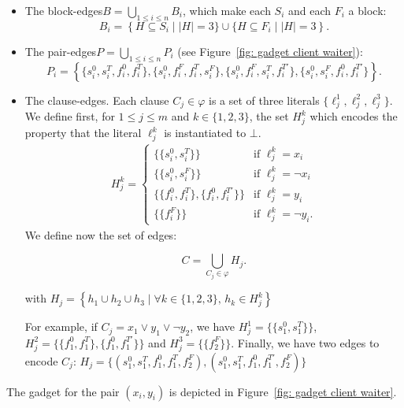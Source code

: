 \documentclass{article}
\newcommand{\hedges}{edges\xspace}
\begin{document}
\begin{itemize}[noitemsep]
    \item The block-\hedges $B = \bigcup_{1 \le i \le n} B_i$, which make each $S_i$ and each $F_i$ a block:
\[
    B_i = \left\{ H \subseteq S_i \mid  \lvert H \rvert=3\} \cup \{H \subseteq F_i \mid  \lvert H \rvert=3 \right\}.
\]


\item The pair-\hedges $P = \bigcup_{1 \le i \le n} P_i$ (see Figure~\ref{fig: gadget client waiter}):
\[ 
    P_i = \left\{ \{s_i^0, s_i^T, f_i^0, f_i^T \}, \{s_i^0, f_i^F, f_i^T, s_i^{F} \}, \{s_i^0, f_i^F, s_i^T, f_i^{T'} \}, \{s_i^0, s_i^F, f_i^0, f_i^{T'} \} \right \}.
\]



\item The clause-\hedges. Each clause $C_j \in \varphi$ is a set of three literals $\{\ell_{j}^1,\ell_{j}^2,\ell_{j}^3\}$. We define first, for $1 \le j \le m$ and $k \in \{ 1, 2, 3\}$, the set $H_{j}^k$ which encodes the property that the literal $\ell_{j}^k$ is instantiated to $\bot$. 
\begin{align*}
    H_{j}^k = \begin{cases} 
    \{\{s_{i}^0,s_{i}^T\}\} & \text{if } \ell_{j}^k = x_i \\
    \{\{s_{i}^0,s_{i}^F\}\} & \text{if } \ell_{j}^k = \neg x_i \\
    \{\{f_{i}^0,f_{i}^T\},\{f_{i}^0,f_{i}^{T'}\}\} & \text{if } \ell_{j}^k =  y_i \\
    \{\{f_{i}^F\}\} & \text{if } \ell_{j}^k = \neg y_i. 
    \end{cases}
\end{align*}
We define now the set of \hedges:
   
$$ C = \bigcup_{C_j \in \varphi} H_j. $$

\noindent with $H_j = \left\{ h_{1} \cup h_{2} \cup h_{3} \mid \forall k \in \{ 1,2,3 \},\, h_k \in H_{j}^k\right\}$

For example, if $C_j = x_1 \vee y_1 \vee \neg y_2$, we have $H_j^1 = \{ \{s_1^0, s_1^T\} \}$, $H_j^2 = \{ \{f_1^0, f_1^T\}, \{ f_1^0, f_1^{T'}\} \}$ and $H_j^3 = \{\{ f_2^F\}\}$. Finally, we have two \hedges to encode $C_j$: $H_j = \{ (s_1^0, s_1^T, f_1^0, f_1^{T}, f_2^F), (s_1^0, s_1^T, f_1^0, f_1^{T'}, f_2^F)  \}$

\end{itemize}

The gadget for the pair $(x_i,y_i)$ is depicted in Figure~\ref{fig: gadget client waiter}.
\end{document}
